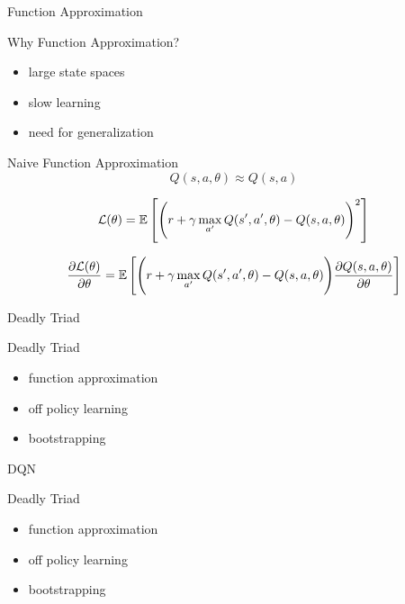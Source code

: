 \begin{frame}{Function Approximation}

    Why Function Approximation?

    \begin{itemize}
        \item large state spaces
        \item slow learning
        \item need for generalization
    \end{itemize}

\end{frame}

\begin{frame}{Naive Function Approximation}
    \begin{equation*}
    Q(s,a,\theta ) \approx Q(s,a)
\end{equation*}

\begin{equation*}
    \mathcal{L}(\theta )=\operatorname{\mathbb{E}} \left [\Bigg( r+\gamma\max_{a'} Q(s',a',\theta )-Q(s,a,\theta )\Bigg)^2\right] 
\end{equation*}

\begin{equation*}
    \frac{\partial \mathcal{L}(\theta )}{\partial \theta }=\operatorname{\mathbb{E}} \left [\Bigg( r+\gamma\max_{a'} Q(s',a',\theta )-Q(s,a,\theta )\Bigg)\frac{\partial Q(s,a,\theta )}{\partial \theta }\right] 
\end{equation*}


\end{frame}

\begin{frame}{Deadly Triad}

    \begin{alertblock}{Deadly Triad}
        \begin{itemize}
        \item function approximation
        \item off policy learning
        \item bootstrapping
        \end{itemize}
	\end{alertblock}
      

\end{frame}

\begin{frame}{DQN}

    \begin{alertblock}{Deadly Triad}
        \begin{itemize}
        \item function approximation
        \item off policy learning
        \item bootstrapping
        \end{itemize}
	\end{alertblock}
      

\end{frame}

